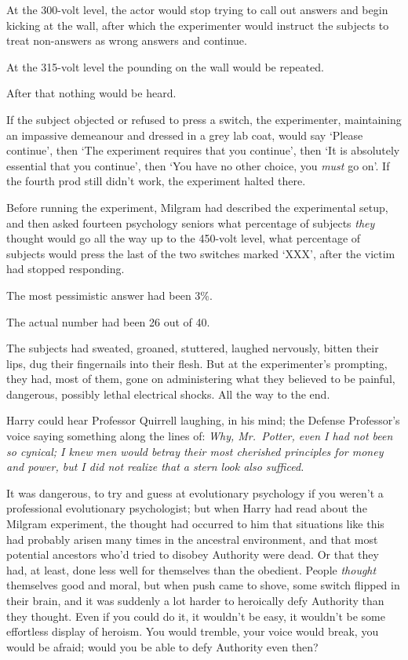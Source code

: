 At the 300-volt level, the actor would stop trying to call out answers and begin kicking at the wall, after which the experimenter would instruct the subjects to treat non-answers as wrong answers and continue.

At the 315-volt level the pounding on the wall would be repeated.

After that nothing would be heard.

If the subject objected or refused to press a switch, the experimenter, maintaining an impassive demeanour and dressed in a grey lab coat, would say `Please continue', then `The experiment requires that you continue', then `It is absolutely essential that you continue', then `You have no other choice, you \emph{must} go on'. If the fourth prod still didn't work, the experiment halted there.

Before running the experiment, Milgram had described the experimental setup, and then asked fourteen psychology seniors what percentage of subjects \emph{they} thought would go all the way up to the 450-volt level, what percentage of subjects would press the last of the two switches marked `XXX', after the victim had stopped responding.

The most pessimistic answer had been 3\%.

The actual number had been 26 out of 40.

The subjects had sweated, groaned, stuttered, laughed nervously, bitten their lips, dug their fingernails into their flesh. But at the experimenter's prompting, they had, most of them, gone on administering what they believed to be painful, dangerous, possibly lethal electrical shocks. All the way to the end.

Harry could hear Professor Quirrell laughing, in his mind; the Defense Professor's voice saying something along the lines of: \emph{Why, Mr.~Potter, even I had not been so cynical; I knew men would betray their most cherished principles for money and power, but I did not realize that a stern look also sufficed.}

It was dangerous, to try and guess at evolutionary psychology if you weren't a professional evolutionary psychologist; but when Harry had read about the Milgram experiment, the thought had occurred to him that situations like this had probably arisen many times in the ancestral environment, and that most potential ancestors who'd tried to disobey Authority were dead. Or that they had, at least, done less well for themselves than the obedient. People \emph{thought} themselves good and moral, but when push came to shove, some switch flipped in their brain, and it was suddenly a lot harder to heroically defy Authority than they thought. Even if you could do it, it wouldn't be easy, it wouldn't be some effortless display of heroism. You would tremble, your voice would break, you would be afraid; would you be able to defy Authority even then?

